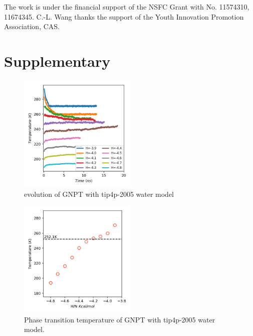 \documentclass[aps,prl,twocolumn,superscriptaddress]{revtex4-1}
\begin{document}
The work is under the financial support of the NSFC Grant with No. 11574310, 11674345. C.-L. Wang thanks the support of the Youth Innovation Promotion Association, CAS. 

\section{Supplementary}

\begin{figure}[ht]
\centering{}\includegraphics[width=0.5\textwidth]{PoteScan-2005.png} 
\caption{evolution of GNPT with tip4p-2005 water model
\label{fig:evolution-2005}} 
\end{figure}
\begin{figure}[ht]
\centering{}\includegraphics[width=0.5\textwidth]{PTtemp-2005.png} 
\caption{Phase transition temperature of GNPT with tip4p-2005 water model.
\label{fig:PTtemp-2005}} 
\end{figure}
\end{document}

